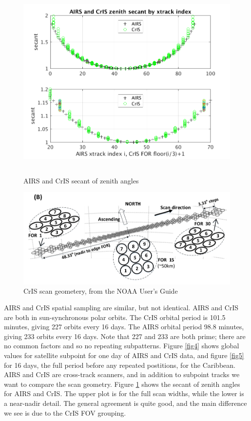 \documentclass[12pt]{article}
\begin{document}
\begin{figure} %
  \centering
  \includegraphics[height=10cm]{figures/AIRS_CrIS_secant_by_xtrack.png}
  \caption{AIRS and CrIS secant of zenith angles}
  \label{fig6}
\end{figure}

\begin{figure} %
  \centering
  \includegraphics[width=0.9\linewidth]{figures/cris_for_2.png}
  \caption{CrIS scan geometery, from the NOAA User's Guide \cite{ntech1}}
  \label{fig7}
\end{figure}

AIRS and CrIS spatial sampling are similar, but not identical.
AIRS and CrIS are both in sun-synchronous polar orbits.  The CrIS
orbital period is 101.5 minutes, giving 227 orbits every 16 days.
The AIRS orbital period 98.8 minutes, giving 233 orbits every 16
days.  Note that 227 and 233 are both prime; there are no common
factors and so no repeating subpatterns.  Figure \ref{fig4} shows
global values for satellite subpoint for one day of AIRS and CrIS
data, and figure \ref{fig5} for 16 days, the full period before any
repeated postitions, for the Caribbean.  AIRS and CrIS are
cross-track scanners, and in addition to subpoint tracks we want to
compare the scan geometry.  Figure \ref{fig6} shows the secant of
zenith angles for AIRS and CrIS.  The upper plot is for the full
scan widths, while the lower is a near-nadir detail.  The general
agreement is quite good, and the main difference we see is due to
the CrIS FOV grouping.
\end{document}
